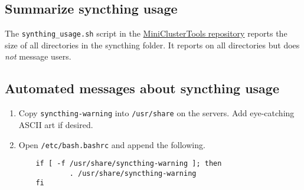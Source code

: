 \subsection{Summarize syncthing usage} \label{subsec:syncsize}

The \texttt{synthing\_usage.sh} script in the \href{https://github.com/coyleej/MiniClusterTools}{MiniClusterTools repository} reports the size of all directories in the syncthing folder. It reports on all directories but does \emph{not} message users.  

\subsection{Automated messages about syncthing usage} \label{subsec:syncautomessage}

\begin{enumerate}
\item Copy \texttt{syncthing-warning} into \texttt{/usr/share} on the servers. Add eye-catching ASCII art if desired.

\item Open \texttt{/etc/bash.bashrc} and append the following.

	\begin{verbatim}
	if [ -f /usr/share/syncthing-warning ]; then
	        . /usr/share/syncthing-warning
	fi
	\end{verbatim}
\end{enumerate}
